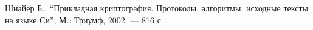 \begin{thebibliography}{1}
 Шнайер Б., ``Прикладная криптография. Протоколы, алгоритмы, исходные тексты на языке Си'', М.: Триумф, 2002. — 816 с.
\end{thebibliography}
